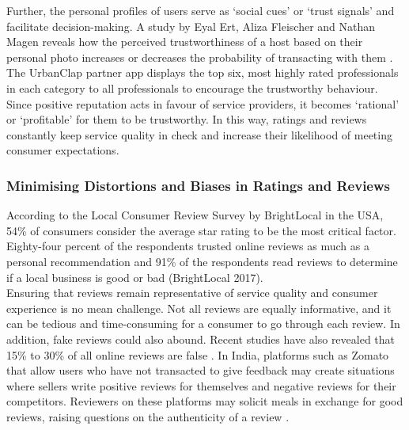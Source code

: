 \documentclass[a4paper, 12pt]{article}
\begin{document}
Further, the personal profiles of users serve as ‘social cues’ or ‘trust signals’ and facilitate decision-making. A study by Eyal Ert, Aliza Fleischer and Nathan Magen reveals how the perceived trustworthiness of a host based on their personal photo increases or decreases the probability of transacting with them \parencite{ert2016trust}.\\

The UrbanClap partner app displays the top six, most highly rated professionals in each category to all professionals to encourage the trustworthy behaviour. \\

Since positive reputation acts in favour of service providers, it becomes ‘rational’ or ‘profitable’ for them to be trustworthy. In this way, ratings and reviews constantly keep service quality in check and increase their likelihood of meeting consumer expectations.\\

                    
                    \subsubsection{Minimising Distortions and Biases in Ratings and Reviews}
                    
                    According to the Local Consumer Review Survey by BrightLocal in the USA, 54\% of consumers consider the average star rating to be the most critical factor. Eighty-four percent of the respondents trusted online reviews as much as a personal recommendation and 91\% of the respondents read reviews to determine if a local business is good or bad (BrightLocal 2017). \\ 

Ensuring that reviews remain representative of service quality and consumer experience is no mean challenge. Not all reviews are equally informative, and it can be tedious and time-consuming for a consumer to go through each review. In addition, fake reviews could also abound. Recent studies have also revealed that 15\% to 30\% of all online reviews are false \parencite{ivanova2017can}. In India, platforms such as Zomato that allow users who have not transacted to give feedback may create situations where sellers write positive reviews for themselves and negative reviews for their competitors. Reviewers on these platforms may solicit meals in exchange for good reviews, raising questions on the authenticity of a review \parencite{ChaddahP}.\\
\end{document}
